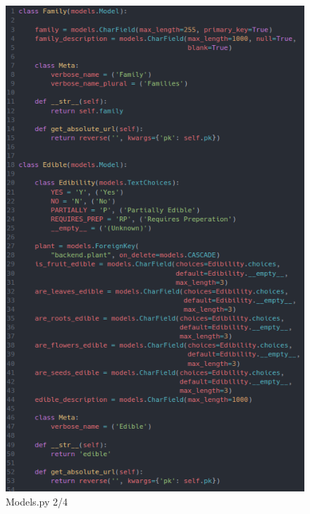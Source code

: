 \documentclass{article}
\begin{document}
    \begin{figure}
        \centering
        \caption{Models.py 2/4}
        \includegraphics[scale=0.9]{models2}
    \end{figure}
\end{document}
